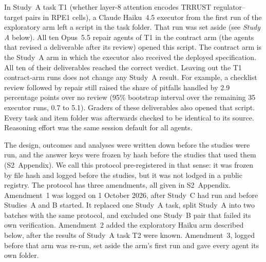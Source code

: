 \documentclass[10pt,letterpaper]{article}
\begin{document}
In Study~A task T1 (whether layer-8 attention encodes TRRUST
regulator--target pairs in RPE1 cells), a Claude
Haiku~4.5 executor from the first run of the exploratory arm left a
script in the task folder. That run was set aside (see \emph{Study A}
below). All ten Opus~5.5 repair agents of T1 in the contract arm (the
agents that revised a deliverable after its review) opened this script. The contract arm is the Study~A arm in which the
executor also received the deployed specification. All ten of their
deliverables reached the correct verdict. Leaving out the T1
contract-arm runs does not change any Study~A result. For example, a
checklist review followed by repair still raised the share of pitfalls
handled by 2.9 percentage points over no review (95\% bootstrap interval
over the remaining 35 executor runs, 0.7 to 5.1). Graders of these
deliverables also opened that script.
Every task and item folder was afterwards checked to be identical to its
source.
Reasoning effort was the same session default for all agents.

The design, outcomes and analyses were written down before the studies
were run, and the answer keys were frozen by hash before the studies that
used them (S2~Appendix). We call this protocol pre-registered in that
sense: it was frozen by file hash and logged before the studies, but it
was not lodged in a public registry. The protocol has three amendments, all given in
S2~Appendix. Amendment~1 was logged on 1 October 2026, after Study~C had run
and before Studies~A and B started. It replaced one Study~A task, split
Study~A into two batches with the same protocol, and excluded one Study~B
pair that failed its own verification. Amendment~2 added the exploratory
Haiku arm described below, after the results of Study~A task T2 were
known. Amendment~3, logged before that arm was re-run, set aside the
arm's first run and gave every agent its own folder.
\end{document}
